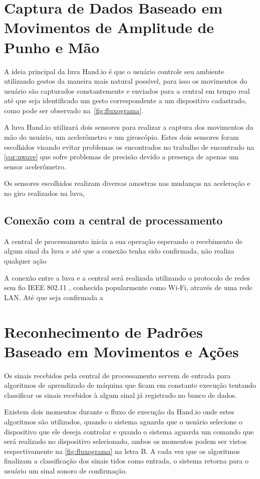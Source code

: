 \section{Captura de Dados Baseado em Movimentos de Amplitude de Punho e Mão}

A ideia principal da luva Hand.io é que o usuário controle seu ambiente utilizando gestos da maneira mais natural possível, para isso os movimentos do usuário são capturados constantemente e enviados para a central em tempo real até que seja identificado um gesto correspondente a um dispositivo cadastrado, como pode ser observado na~\autoref{fig:fluxograma}.

A luva Hand.io utilizará dois sensores para realizar a captura dos movimentos da mão do usuário, um acelerômetro e um giroscópio. Estes dois sensores foram escolhidos visando evitar problemas os encontrados no trabalho de  encontrado na \autoref{cor:uwave} que sofre problemas de precisão devido a presença de apenas um sensor acelerômetro.

Os sensores escolhidos realizam diversas amostras nas mudanças na aceleração e no giro realizados na luva, 



\subsection{Conexão com a central de processamento}

A central de processamento inicia a sua operação esperando o recebimento de algum sinal da luva e até que a conexão tenha sido confirmada, não realiza qualquer ação

A conexão entre a luva e a central será realizada utilizando o protocolo de redes sem fio IEEE 802.11  \cite{802.11:1997}, conhecida popularmente como Wi-Fi, através de uma rede LAN. Até que seja confirmada a 

\section{Reconhecimento de Padrões Baseado em Movimentos e Ações}

Os sinais recebidos pela central de processamento servem de entrada para algoritmos de aprendizado de máquina que ficam em constante execução tentando classificar os sinais recebidos à algum sinal já registrado no banco de dados. 

Existem dois momentos durante o fluxo de execução da Hand.io onde estes algoritmos são utilizados, quando o sistema aguarda que o usuário selecione o dispositivo que ele deseja controlar e quando o sistema aguarda um comando que será realizado no dispositivo selecionado, ambos os momentos podem ser vistos respectivamente na \autoref{fig:fluxograma} na letra B. A cada vez que os algoritmos finalizam a classificação dos sinais tidos como entrada, o sistema retorna para o usuário um sinal sonoro de confirmação. 


